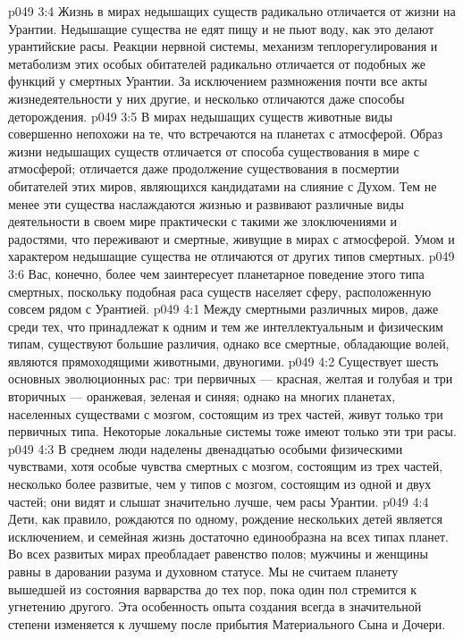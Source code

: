 \vs p049 3:4 Жизнь в мирах недышащих существ радикально отличается от жизни на Урантии. Недышащие существа не едят пищу и не пьют воду, как это делают урантийские расы. Реакции нервной системы, механизм теплорегулирования и метаболизм этих особых обитателей радикально отличается от подобных же функций у смертных Урантии. За исключением размножения почти все акты жизнедеятельности у них другие, и несколько отличаются даже способы деторождения.
\vs p049 3:5 В мирах недышащих существ животные виды совершенно непохожи на те, что встречаются на планетах с атмосферой. Образ жизни недышащих существ отличается от способа существования в мире с атмосферой; отличается даже продолжение существования в посмертии обитателей этих миров, являющихся кандидатами на слияние с Духом. Тем не менее эти существа наслаждаются жизнью и развивают различные виды деятельности в своем мире практически с такими же злоключениями и радостями, что переживают и смертные, живущие в мирах с атмосферой. Умом и характером недышащие существа не отличаются от других типов смертных.
\vs p049 3:6 Вас, конечно, более чем заинтересует планетарное поведение этого типа смертных, поскольку подобная раса существ населяет сферу, расположенную совсем рядом с Урантией.
\vs p049 4:1 Между смертными различных миров, даже среди тех, что принадлежат к одним и тем же интеллектуальным и физическим типам, существуют большие различия, однако все смертные, обладающие волей, являются прямоходящими животными, двуногими.
\vs p049 4:2 Существует шесть основных эволюционных рас: три первичных --- красная, желтая и голубая и три вторичных --- оранжевая, зеленая и синяя; однако на многих планетах, населенных существами с мозгом, состоящим из трех частей, живут только три первичных типа. Некоторые локальные системы тоже имеют только эти три расы.
\vs p049 4:3 В среднем люди наделены двенадцатью особыми физическими чувствами, хотя особые чувства смертных с мозгом, состоящим из трех частей, несколько более развитые, чем у типов с мозгом, состоящим из одной и двух частей; они видят и слышат значительно лучше, чем расы Урантии.
\vs p049 4:4 Дети, как правило, рождаются по одному, рождение нескольких детей является исключением, и семейная жизнь достаточно единообразна на всех типах планет. Во всех развитых мирах преобладает равенство полов; мужчины и женщины равны в даровании разума и духовном статусе. Мы не считаем планету вышедшей из состояния варварства до тех пор, пока один пол стремится к угнетению другого. Эта особенность опыта создания всегда в значительной степени изменяется к лучшему после прибытия Материального Сына и Дочери.
